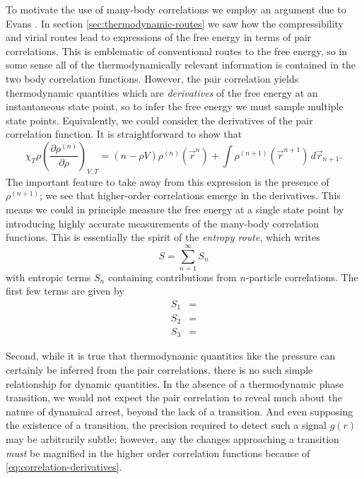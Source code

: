 To motivate the use of many-body correlations we employ an argument due to Evans \cite{EvansPrivate2019}.
In section \ref{sec:thermodynamic-routes} we saw how the compressibility and virial routes lead to expressions of the free energy in terms of pair correlations.
This is emblematic of conventional routes to the free energy, so in some sense all of the thermodynamically relevant information is contained in the two body correlation functions.
However, the pair correlation yields thermodynamic quantities which are \emph{derivatives} of the free energy at an instantaneous state point, so to infer the free energy we must sample multiple state points.
Equivalently, we could consider the derivatives of the pair correlation function.
It is straightforward to show that \cite{Santos2016}
\begin{equation}\label{eq:correlation-derivatives}
  \chi_T \rho
  \left( \frac{\partial \rho^{(n)}}{\partial \rho} \right)_{V,T}
  =
  (n - \rho V) \rho^{(n)}(\vec{r}^n)
  + \int \rho^{(n+1)}(\vec{r}^{n+1}) \, d\vec{r}_{n+1}.
\end{equation}
The important feature to take away from this expression is the presence of $\rho^{(n+1)}$; we see that higher-order correlations emerge in the derivatives.
This means we could in principle measure the free energy at a single state point by introducing highly accurate measurements of the many-body correlation functions.
This is essentially the spirit of the \emph{entropy route}, which writes \cite{WallaceJCP1987}
\begin{equation}
  S = \sum_{n=1}^\infty S_n
\end{equation}
with entropic terms $S_n$ containing contributions from $n$-particle correlations.
The first few terms are given by
\begin{subequations}
  \begin{align}
    S_1
    &=
    \\
    S_2
    &=
    \\
    S_3
    &=
  \end{align}
\end{subequations}

Second, while it is true that thermodynamic quantities like the pressure can certainly be inferred from the pair correlations, there is no such simple relationship for dynamic quantities.
In the absence of a thermodynamic phase transition, we would not expect the pair correlation to reveal much about the nature of dynamical arrest, beyond the lack of a transition.
And even supposing the existence of a transition, the precision required to detect such a signal $g(r)$ may be arbitrarily subtle; however, any the changes approaching a transition \emph{must} be magnified in the higher order correlation functions because of \eqref{eq:correlation-derivatives}.

